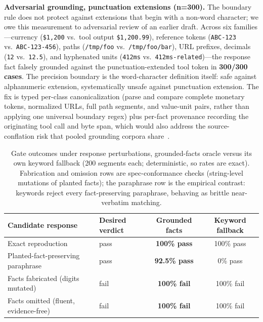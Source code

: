 \documentclass{article}
\newcommand{\code}[1]{\texttt{\small #1}}
\begin{document}
\textbf{Adversarial grounding, punctuation extensions (n=300).} The boundary rule does not protect against extensions that begin with a non-word character; we owe this measurement to adversarial review of an earlier draft. Across six families---currency (\code{\$1,200} vs.\ tool output \code{\$1,200.99}), reference tokens (\code{ABC-123} vs.\ \code{ABC-123-456}), paths (\code{/tmp/foo} vs.\ \code{/tmp/foo/bar}), URL prefixes, decimals (\code{12} vs.\ \code{12.5}), and hyphenated units (\code{412ms} vs.\ \code{412ms-related})---the response fact falsely grounded against the punctuation-extended tool token in \textbf{300/300 cases}. The precision boundary is the word-character definition itself: safe against alphanumeric extension, systematically unsafe against punctuation extension. The fix is typed per-class canonicalization (parse and compare complete monetary tokens, normalized URLs, full path segments, and value-unit pairs, rather than applying one universal boundary regex) plus per-fact provenance recording the originating tool call and byte span, which would also address the source-conflation risk that pooled grounding corpora share~\citep{alvarez2026provenanceguard}.

\begin{table}[t]
\centering
\caption{Gate outcomes under response perturbations, grounded-facts oracle versus its own keyword fallback (200 segments each; deterministic, so rates are exact). Fabrication and omission rows are spec-conformance checks (string-level mutations of planted facts); the paraphrase row is the empirical contrast: keywords reject every fact-preserving paraphrase, behaving as brittle near-verbatim matching.}
\label{tab:perturbation}
\small
\begin{tabular}{llcc}
\toprule
Candidate response & Desired verdict & Grounded facts & Keyword fallback \\
\midrule
Exact reproduction & pass & \textbf{100\% pass} & 100\% pass \\
Planted-fact-preserving paraphrase & pass & \textbf{92.5\% pass} & 0\% pass \\
Facts fabricated (digits mutated) & fail & \textbf{100\% fail} & 100\% fail \\
Facts omitted (fluent, evidence-free) & fail & \textbf{100\% fail} & 100\% fail \\
\bottomrule
\end{tabular}
\end{table}
\end{document}
